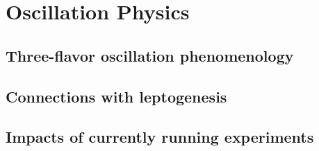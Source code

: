 \section{Oscillation Physics}
\label{sec:landscape-osc}

\subsection{Three-flavor oscillation phenomenology}
\label{sec:landscape-osc-3flavor}

\subsection{Connections with leptogenesis} 
\label{sec:landscape-osc-leptogen}


\subsection{Impacts of currently running experiments}
\label{sec:landscape-osc-impacts}
